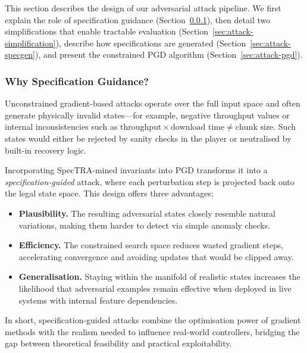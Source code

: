 \documentclass[thesis]{uofithesis} %
\begin{document}
    This section describes the design of our adversarial attack pipeline.
    We first explain the role of specification guidance
    (Section~\ref{sec:attack-why-spec}), then detail two simplifications
    that enable tractable evaluation
    (Section~\ref{sec:attack-simplification}), describe how specifications
    are generated (Section~\ref{sec:attack-specgen}), and present the
    constrained PGD algorithm (Section~\ref{sec:attack-pgd}).
    
    
    \subsubsection{Why Specification Guidance?}
    \label{sec:attack-why-spec}
    
    Unconstrained gradient-based attacks operate over the full input space
    and often generate physically invalid states---for example, negative
    throughput values or internal inconsistencies such as
    $\text{throughput} \times \text{download time} \neq \text{chunk size}$.
    Such states would either be rejected by sanity checks in the player or
    neutralised by built-in recovery logic.
    
    Incorporating SpecTRA-mined invariants into PGD transforms it into a
    \emph{specification-guided} attack, where each perturbation step is
    projected back onto the legal state space.  This design offers three
    advantages:
    \begin{itemize}
        \item \textbf{Plausibility.}  The resulting adversarial states
            closely resemble natural variations, making them harder to
            detect via simple anomaly checks.
        \item \textbf{Efficiency.}  The constrained search space reduces
            wasted gradient steps, accelerating convergence and avoiding
            updates that would be clipped away.
        \item \textbf{Generalisation.}  Staying within the manifold of
            realistic states increases the likelihood that adversarial
            examples remain effective when deployed in live systems with
            internal feature dependencies.
    \end{itemize}
    
    In short, specification-guided attacks combine the optimisation power of
    gradient methods with the realism needed to influence real-world
    controllers, bridging the gap between theoretical feasibility and
    practical exploitability.
    
\end{document}
